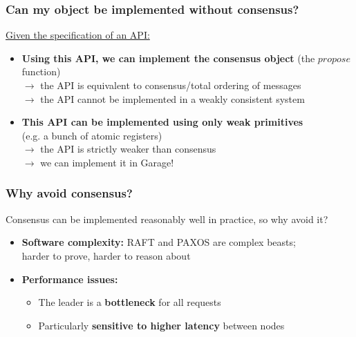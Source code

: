 \documentclass[aspectratio=169]{beamer}
\begin{document}
\begin{frame}
	\frametitle{Can my object be implemented without consensus?}
	\underline{Given the specification of an API:}
	\vspace{2em}
	\begin{itemize}
		\item \textbf{Using this API, we can implement the consensus object} (the $propose$ function)\\
			$\to$ the API is equivalent to consensus/total ordering of messages\\
			$\to$ the API cannot be implemented in a weakly consistent system
			\vspace{2em}
		\item \textbf{This API can be implemented using only weak primitives}\\
			(e.g. a bunch of atomic registers)\\
			$\to$ the API is strictly weaker than consensus\\
			$\to$ we can implement it in Garage!
	\end{itemize}
\end{frame}

\begin{frame}
	\frametitle{Why avoid consensus?}
	Consensus can be implemented reasonably well in practice, so why avoid it?
	\vspace{2em}
	\begin{itemize}
		\item \textbf{Software complexity:} RAFT and PAXOS are complex beasts;\\
			harder to prove, harder to reason about
			\vspace{1.5em}
		\item \textbf{Performance issues:}
			\vspace{1em}
			\begin{itemize}
				\item The leader is a \textbf{bottleneck} for all requests
					\vspace{1em}
				\item Particularly \textbf{sensitive to higher latency} between nodes
			\end{itemize}
	\end{itemize}
\end{frame}
\end{document}

